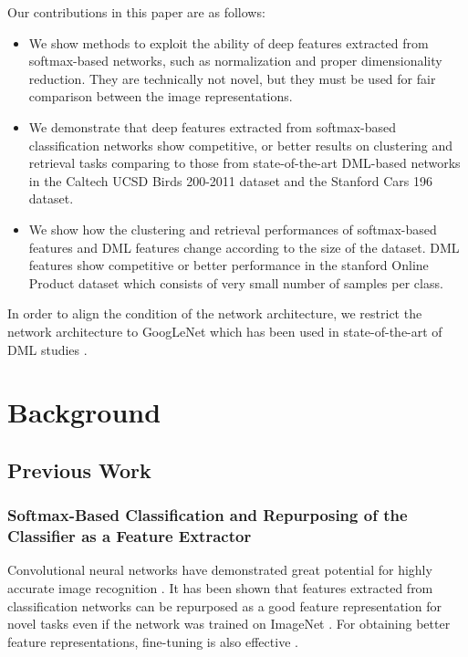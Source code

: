 \documentclass[9pt,technote,compsoc]{./sty/IEEEtran}
\begin{document}
Our contributions in this paper are as follows:
\begin{itemize}
	\item We show methods to exploit the ability of deep features extracted from softmax-based networks, such as normalization and proper dimensionality reduction. They are technically not novel, but they must be used for fair comparison between the image representations.
	\item We demonstrate that deep features extracted from softmax-based classification networks show competitive, or better results on clustering and retrieval tasks comparing to those from state-of-the-art DML-based networks \cite{song2016deep,sohn2016improved,song2017learnable} in the Caltech UCSD Birds 200-2011 dataset and the Stanford Cars 196 dataset.
	\item We show how the clustering and retrieval performances of softmax-based features and DML features change according to the size of the dataset. DML features show competitive or better 
performance in the stanford Online Product dataset which consists of very small number of samples 
per class. 
\end{itemize}

In order to align the condition of the network architecture, we restrict the network architecture to GoogLeNet \cite{szegedy2015going} which has been used in state-of-the-art of DML studies \cite{song2016deep,sohn2016improved,song2017learnable}.



\section{Background}
\subsection{Previous Work}
\subsubsection{Softmax-Based Classification and Repurposing of the Classifier as a Feature Extractor}
Convolutional neural networks have demonstrated great potential for highly accurate image recognition \cite{krizhevsky2012imagenet}\cite{simonyan2015very}\cite{szegedy2015going}\cite{he2016deep}.
It has been shown that features extracted from classification networks can be repurposed as a good feature representation for novel tasks \cite{donahue2014decaf}\cite{razavian2014cnn}\cite{qian2015fine} even if the network was trained on ImageNet \cite{russakovsky2015imagenet}.
For obtaining better feature representations, fine-tuning is also effective \cite{babenko2014neural}.
\end{document}
